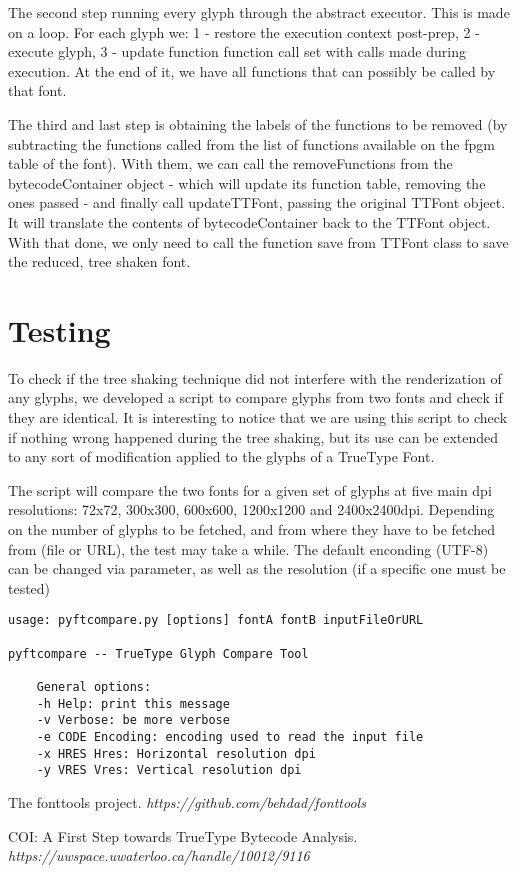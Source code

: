 \documentclass[12pt]{article}
\begin{document}
The second step running every glyph through the abstract executor.
This is made on a loop. For each glyph we: 1 - restore the execution
context post-prep, 2 - execute glyph, 3 - update function function call
set with calls made during execution. At the end of it, we have all
functions that can possibly be called by that font.

The third and last step is obtaining the labels of the functions
to be removed (by subtracting the functions called from the list of
functions available on the fpgm table of the font). With them, we can
call the removeFunctions from the bytecodeContainer object - which will
update its function table, removing the ones passed - and finally call
updateTTFont, passing the original TTFont object. It will translate the
contents of bytecodeContainer back to the TTFont object. With that done,
we only need to call the function save from TTFont class to save the
reduced, tree shaken font.

\section{Testing}

To check if the tree shaking technique did not interfere with the
renderization of any glyphs, we developed a script to compare glyphs
from two fonts and check if they are identical. It is interesting to
notice that we are using this script to check if nothing wrong happened
during the tree shaking, but its use can be extended to any sort of
modification applied to the glyphs of a TrueType Font.

The script will compare the two fonts for a given set of glyphs at
five main dpi resolutions: 72x72, 300x300, 600x600, 1200x1200 and
2400x2400dpi. Depending on the number of glyphs to be fetched, and from
where they have to be fetched from (file or URL), the test may take a
while. The default enconding (UTF-8) can be changed via parameter, as
well as the resolution (if a specific one must be tested)

\begin{lstlisting}
usage: pyftcompare.py [options] fontA fontB inputFileOrURL

pyftcompare -- TrueType Glyph Compare Tool

    General options:
    -h Help: print this message
    -v Verbose: be more verbose
    -e CODE Encoding: encoding used to read the input file
    -x HRES Hres: Horizontal resolution dpi
    -y VRES Vres: Vertical resolution dpi
\end{lstlisting}

\clearpage
\begin{thebibliography}{1}

 The fonttools project. {\em https://github.com/behdad/fonttools } 

 COI: A First Step towards TrueType Bytecode Analysis.
{\em https://uwspace.uwaterloo.ca/handle/10012/9116 } 

\end{thebibliography}
\end{document}
